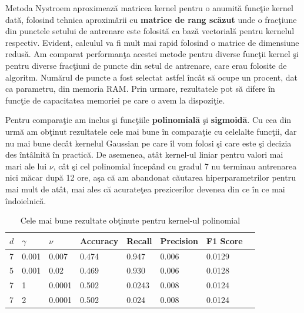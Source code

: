 Metoda Nystroem aproximează matricea kernel pentru o anumită funcţie kernel dată,
folosind tehnica aproximării cu \textbf{matrice de 
rang scăzut} unde o fracţiune din punctele setului de antrenare este folosită 
ca bază vectorială pentru kernelul respectiv. Evident, calculul va fi mult mai 
rapid folosind o matrice de dimensiune redusă. Am comparat performanţa acestei metode 
pentru diverse funcţii kernel şi pentru diverse fracţiuni de puncte din setul de 
antrenare, care erau folosite de algoritm. Numărul de puncte a fost selectat astfel 
încât să ocupe un procent, dat ca parametru, din memoria RAM. Prin urmare, rezultatele 
pot să difere în funcţie de capacitatea memoriei pe care o avem la dispoziţie.

Pentru comparaţie am inclus şi funcţiile \textbf{polinomială} şi 
\textbf{sigmoidă}. Cu cea din urmă am obţinut rezultatele cele mai bune în comparaţie
cu celelalte funcţii, dar  
nu mai bune decât kernelul Gaussian pe care îl vom folosi şi care 
este şi decizia des întâlnită în practică. De asemenea, atât kernel-ul liniar pentru valori mai mari
ale lui $\nu$, 
cât şi cel polinomial începând cu gradul 7 nu terminau antrenarea nici măcar 
după 12 ore, aşa că am abandonat căutarea hiperparametrilor pentru mai mult 
de atât, mai ales că acurateţea prezicerilor devenea din ce în ce mai îndoielnică.

\begin{table}[H]
    \centering
    \begin{tabularx}{\textwidth}{
        |X
        |X
        |X
        |X
        |X
        |X
        |X
        |X|
    }
    \hline
    $d$ & $\gamma$ & $\nu$ & {Accuracy} & {Recall} & {Precision} & {F1 Score} \\
    \hline
    \rowcolor{gray!20} 7 & 0.001 & 0.007 & 0.474	& 0.947 & 0.006	& 0.0129    \\
    5 & 0.001 & 0.02 & 0.469	& 0.930	& 0.006	& 0.0128 \\
    \rowcolor{gray!20} 7 & 1 & 0.0001	& 0.502	& 0.0243	& 0.008	& 0.0124   \\
    7 & 2 & 0.0001 & 0.502	& 0.024	& 0.008	& 0.0124 \\
    \hline
  \end{tabularx}
  \caption{Cele mai bune rezultate obţinute pentru kernel-ul polinomial}
\end{table}


